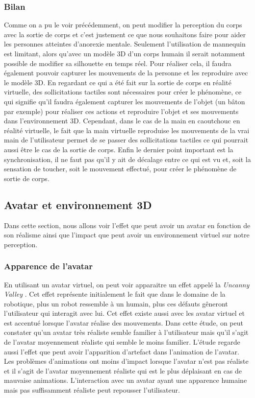 \subsubsection{Bilan}
Comme on a pu le voir précédemment, on peut modifier la perception du corps avec la sortie de corps et c'est justement ce que nous souhaitons faire pour aider les personnes atteintes d'anorexie mentale. Seulement l'utilisation de mannequin est limitant, alors qu'avec un modèle 3D d'un corps humain il serait notamment possible de modifier sa silhouette en temps réel. Pour réaliser cela, il faudra également pouvoir capturer les mouvements de la personne et les reproduire avec le modèle 3D. En regardant ce qui a été fait sur la sortie de corps en réalité virtuelle, des sollicitations tactiles sont nécessaires pour créer le phénomène, ce qui signifie qu'il faudra également capturer les mouvements de l'objet (un bâton par exemple) pour réaliser ces actions et reproduire l'objet et ses mouvements dans l'environnement 3D. Cependant, dans le cas de la main en caoutchouc en réalité virtuelle, le fait que la main virtuelle reproduise les mouvements de la vrai main de l'utilisateur permet de se passer des sollicitations tactiles ce qui pourrait aussi être le cas de la sortie de corps. Enfin le dernier point important est la synchronisation, il ne faut pas qu'il y ait de décalage entre ce qui est vu et, soit la sensation de toucher, soit le mouvement effectué, pour créer le phénomène de sortie de corps.

\subsection{Avatar et environnement 3D}
Dans cette section, nous allons voir l'effet que peut avoir un avatar en fonction de son réalisme ainsi que l'impact que peut avoir un environnement virtuel sur notre perception. 
\subsubsection{Apparence de l'avatar}
En utilisant un avatar virtuel, on peut voir apparaitre un effet appelé la \emph{Uncanny Valley} \cite{mo12}. Cet effet représente initialement le fait que dans le domaine de la robotique, plus un robot ressemble à un humain, plus ces défauts gêneront l'utilisateur qui interagit avec lui. Cet effet existe aussi avec les avatar virtuel \cite{mc12} et est accentué lorsque l'avatar réalise des mouvements. Dans cette étude, on peut constater qu'un avatar très réaliste semble familier à l'utilisateur mais qu'il s'agit de l'avatar moyennement réaliste qui semble le moins familier. L'étude regarde aussi l'effet que peut avoir l'apparition d'artefact dans l'animation de l'avatar. Les problèmes d'animations ont moins d'impact lorsque l'avatar n'est pas réaliste et il s'agit de l'avatar moyennement réaliste qui est le plus déplaisant en cas de mauvaise animations. L'interaction avec un avatar ayant une apparence humaine mais pas suffisamment réaliste peut repousser l'utilisateur.
